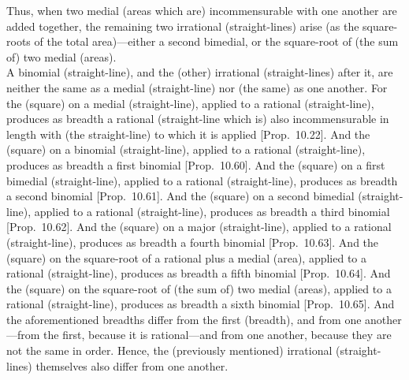 \begin{Parallel}{}{}
{Thus, when two medial (areas which are) incommensurable with one another are added together, the remaining
two irrational (straight-lines) arise (as the square-roots of the total area)---either a second bimedial, or the square-root of (the sum of)
two medial (areas).\\

A binomial (straight-line), and the (other) irrational (straight-lines) 
after it, are neither the same as a medial (straight-line) nor (the same) as one another.
For the (square) on a medial (straight-line), applied to a rational (straight-line),
produces as breadth a rational (straight-line which is) also incommensurable
in length with (the straight-line) to which it is applied [Prop.~10.22]. And the (square) on a binomial
(straight-line), applied to a rational (straight-line), produces
as breadth a first binomial [Prop.~10.60]. 
And the (square) on a first bimedial (straight-line), applied
to a rational (straight-line), produces as breadth a  second binomial
[Prop.~10.61]. And the (square) on a second bimedial (straight-line), applied
to a rational (straight-line), produces as breadth a  third binomial
[Prop.~10.62]. And the (square) on a major (straight-line), applied
to a rational (straight-line), produces as breadth a  fourth binomial
[Prop.~10.63].  And the (square) on the square-root of a rational plus a medial (area), applied
to a rational (straight-line), produces as breadth a  fifth binomial
[Prop.~10.64]. And the (square) on the square-root of (the sum of) two medial (areas), applied
to a rational (straight-line), produces as breadth a  sixth binomial
[Prop.~10.65]. And the aforementioned breadths
differ from the first (breadth), and from one another---from the first, because it is rational---and from one another, because they are not the same in order. Hence, the (previously mentioned) irrational (straight-lines) themselves
also differ from one another.}
\end{Parallel}

